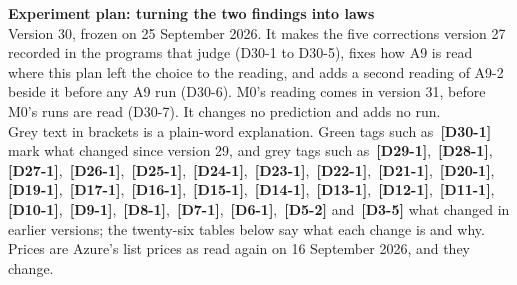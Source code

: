 \documentclass[11pt]{article}
\newcommand{\chg}[1]{\,{\color{chgcol}\bfseries\footnotesize[#1]}}
\newcommand{\chgold}[1]{\,{\color{oldcol}\bfseries\footnotesize[#1]}}
\begin{document}
{\LARGE\bfseries Experiment plan: turning the two findings into laws}\\[3pt]
{\large Version 30, frozen on 25 September 2026. It makes the five corrections version 27 recorded in the programs that judge (D30-1 to D30-5), fixes how A9 is read where this plan left the choice to the reading, and adds a second reading of A9-2 beside it before any A9 run (D30-6). M0's reading comes in version 31, before M0's runs are read (D30-7). It changes no prediction and adds no run.}\\[2pt]
{\color{soft}\small Grey text in brackets is a plain-word explanation. Green tags such as \chg{D30-1} mark what changed since version 29, and grey tags such as \chgold{D29-1}, \chgold{D28-1}, \chgold{D27-1}, \chgold{D26-1}, \chgold{D25-1}, \chgold{D24-1}, \chgold{D23-1}, \chgold{D22-1}, \chgold{D21-1}, \chgold{D20-1}, \chgold{D19-1}, \chgold{D17-1}, \chgold{D16-1}, \chgold{D15-1}, \chgold{D14-1}, \chgold{D13-1}, \chgold{D12-1}, \chgold{D11-1}, \chgold{D10-1}, \chgold{D9-1}, \chgold{D8-1}, \chgold{D7-1}, \chgold{D6-1}, \chgold{D5-2} and \chgold{D3-5} what changed in earlier versions; the twenty-six tables below say what each change is and why. Prices are Azure's list prices as read again on 16 September 2026, and they change.}
\end{document}
